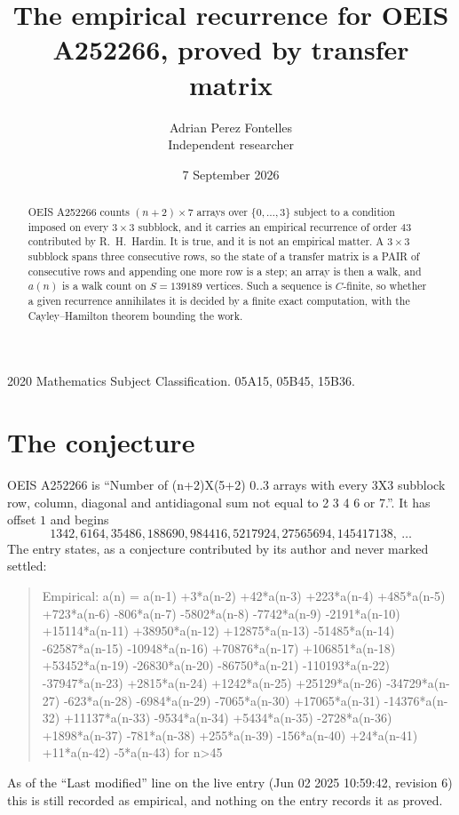 \documentclass[11pt,a4paper]{article}
\title{The empirical recurrence for OEIS A252266, proved by transfer matrix}
\author{Adrian Perez Fontelles\\ \small Independent researcher}
\date{7 September 2026}
\theoremstyle{plain}
\theoremstyle{definition}
\begin{document}
\maketitle

\begin{abstract}
OEIS A252266 counts $(n+2)\times7$ arrays over $\{0,\dots,3\}$ subject to a condition imposed on
every $3\times3$ subblock, and it carries an empirical recurrence of order $43$
contributed by R.~H.~Hardin. It is true, and it is not an empirical matter. A $3\times3$
subblock spans three consecutive rows, so the state of a transfer matrix is a PAIR of
consecutive rows and appending one more row is a step; an array is then a walk, and
$a(n)$ is a walk count on $S=139189$ vertices. Such a sequence is $C$-finite, so whether a given
recurrence annihilates it is decided by a finite exact computation, with the Cayley--Hamilton
theorem bounding the work.
\end{abstract}

\noindent\small 2020 Mathematics Subject Classification. 05A15, 05B45, 15B36.\normalsize

\section{The conjecture}

OEIS A252266 is ``Number of (n+2)X(5+2) 0..3 arrays with every 3X3 subblock row, column, diagonal and antidiagonal sum not equal to 2 3 4 6 or 7.''. It has offset $1$ and begins
\[
1342, 6164, 35486, 188690, 984416, 5217924, 27565694, 145417138,\ \dots
\]
The entry states, as a conjecture contributed by its author and never marked settled:
\begin{quote}
Empirical: a(n) = a(n-1) +3*a(n-2) +42*a(n-3) +223*a(n-4) +485*a(n-5) +723*a(n-6) -806*a(n-7) -5802*a(n-8) -7742*a(n-9) -2191*a(n-10) +15114*a(n-11) +38950*a(n-12) +12875*a(n-13) -51485*a(n-14) -62587*a(n-15) -10948*a(n-16) +70876*a(n-17) +106851*a(n-18) +53452*a(n-19) -26830*a(n-20) -86750*a(n-21) -110193*a(n-22) -37947*a(n-23) +2815*a(n-24) +1242*a(n-25) +25129*a(n-26) -34729*a(n-27) -623*a(n-28) -6984*a(n-29) -7065*a(n-30) +17065*a(n-31) -14376*a(n-32) +11137*a(n-33) -9534*a(n-34) +5434*a(n-35) -2728*a(n-36) +1898*a(n-37) -781*a(n-38) +255*a(n-39) -156*a(n-40) +24*a(n-41) +11*a(n-42) -5*a(n-43) for n>45
\end{quote}
As of the ``Last modified'' line on the live entry (Jun 02 2025 10:59:42, revision 6) this is still
recorded as empirical, and nothing on the entry records it as proved.
\end{document}

